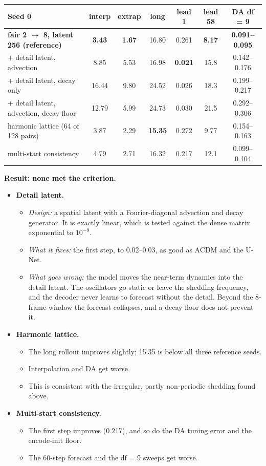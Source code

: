 \begin{center}\footnotesize
\begin{tabular}{lcccccc}
\toprule
Seed 0 & interp & extrap & long & lead 1 & lead 58 & DA df = 9\\
\midrule
\textbf{fair 2 $\to$ 8, latent 256 (reference)} & \textbf{3.43} & \textbf{1.67} & 16.80 & 0.261 & \textbf{8.17} & \textbf{0.091--0.095}\\
+ detail latent, advection        & 8.85 & 5.53 & 16.98 & \textbf{0.021} & 15.8 & 0.142--0.176\\
+ detail latent, decay only       & 16.44 & 9.80 & 24.52 & 0.026 & 18.3 & 0.199--0.217\\
+ detail latent, advection, decay floor & 12.79 & 5.99 & 24.73 & 0.030 & 21.5 & 0.292--0.306\\
harmonic lattice (64 of 128 pairs) & 3.87 & 2.29 & \textbf{15.35} & 0.272 & 9.77 & 0.154--0.163\\
multi-start consistency           & 4.79 & 2.71 & 16.32 & 0.217 & 12.1 & 0.099--0.104\\
\bottomrule
\end{tabular}
\end{center}

\noindent\textbf{Result: none met the criterion.}
\begin{itemize}
\item \textbf{Detail latent.}
  \begin{itemize}
  \item \emph{Design:} a spatial latent with a Fourier-diagonal advection and decay generator.
    It is exactly linear, which is tested against the dense matrix exponential to $10^{-9}$.
  \item \emph{What it fixes:} the first step, to 0.02--0.03, as good as ACDM and the U-Net.
  \item \emph{What goes wrong:} the model moves the near-term dynamics into the detail
    latent. The oscillators go static or leave the shedding frequency, and the decoder never
    learns to forecast without the detail. Beyond the 8-frame window the forecast collapses,
    and a decay floor does not prevent it.
  \end{itemize}
\item \textbf{Harmonic lattice.}
  \begin{itemize}
  \item The long rollout improves slightly; 15.35 is below all three reference seeds.
  \item Interpolation and DA get worse.
  \item This is consistent with the irregular, partly non-periodic shedding found above.
  \end{itemize}
\item \textbf{Multi-start consistency.}
  \begin{itemize}
  \item The first step improves (0.217), and so do the DA tuning error and the encode-init
    floor.
  \item The 60-step forecast and the df = 9 sweeps get worse.
  \end{itemize}
\end{itemize}

